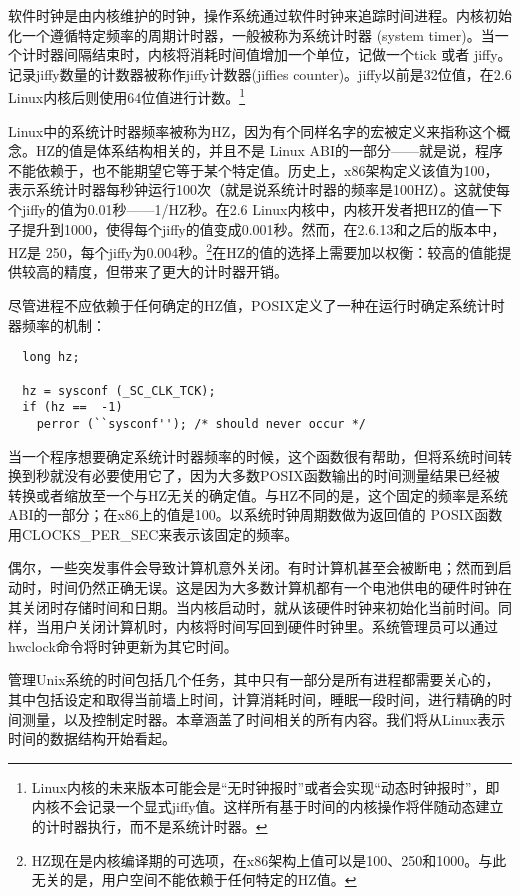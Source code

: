 软件时钟是由内核维护的时钟，操作系统通过软件时钟来追踪时间进程。内核初始化一个遵循特定频率的周期计时器，一般被称为系统计时器 (system timer)。当一个计时器间隔结束时，内核将消耗时间值增加一个单位，记做一个tick 或者 jiffy。记录jiffy数量的计数器被称作jiffy计数器(jiffies counter)。jiffy以前是32位值，在2.6 Linux内核后则使用64位值进行计数。\footnote[1]{Linux内核的未来版本可能会是“无时钟报时”或者会实现“动态时钟报时”，即内核不会记录一个显式jiffy值。这样所有基于时间的内核操作将伴随动态建立的计时器执行，而不是系统计时器。}

Linux中的系统计时器频率被称为HZ，因为有个同样名字的宏被定义来指称这个概念。HZ的值是体系结构相关的，并且不是 Linux ABI的一部分——就是说，程序不能依赖于，也不能期望它等于某个特定值。历史上，x86架构定义该值为100，表示系统计时器每秒钟运行100次（就是说系统计时器的频率是100HZ）。这就使每个jiffy的值为0.01秒——1/HZ秒。在2.6 Linux内核中，内核开发者把HZ的值一下子提升到1000，使得每个jiffy的值变成0.001秒。然而，在2.6.13和之后的版本中，HZ是 250，每个jiffy为0.004秒。\footnote[1]{HZ现在是内核编译期的可选项，在x86架构上值可以是100、250和1000。与此无关的是，用户空间不能依赖于任何特定的HZ值。}在HZ的值的选择上需要加以权衡：较高的值能提供较高的精度，但带来了更大的计时器开销。

尽管进程不应依赖于任何确定的HZ值，POSIX定义了一种在运行时确定系统计时器频率的机制： 

\begin{lstlisting}
  long hz;

  hz = sysconf (_SC_CLK_TCK);
  if (hz ==  -1)
  	perror (``sysconf''); /* should never occur */
\end{lstlisting}
  
当一个程序想要确定系统计时器频率的时候，这个函数很有帮助，但将系统时间转换到秒就没有必要使用它了，因为大多数POSIX函数输出的时间测量结果已经被转换或者缩放至一个与HZ无关的确定值。与HZ不同的是，这个固定的频率是系统ABI的一部分；在x86上的值是100。以系统时钟周期数做为返回值的 POSIX函数用CLOCKS\_PER\_SEC来表示该固定的频率。

偶尔，一些突发事件会导致计算机意外关闭。有时计算机甚至会被断电；然而到启动时，时间仍然正确无误。这是因为大多数计算机都有一个电池供电的硬件时钟在其关闭时存储时间和日期。当内核启动时，就从该硬件时钟来初始化当前时间。同样，当用户关闭计算机时，内核将时间写回到硬件时钟里。系统管理员可以通过hwclock命令将时钟更新为其它时间。

管理Unix系统的时间包括几个任务，其中只有一部分是所有进程都需要关心的，其中包括设定和取得当前墙上时间，计算消耗时间，睡眠一段时间，进行精确的时间测量，以及控制定时器。本章涵盖了时间相关的所有内容。我们将从Linux表示时间的数据结构开始看起。 

